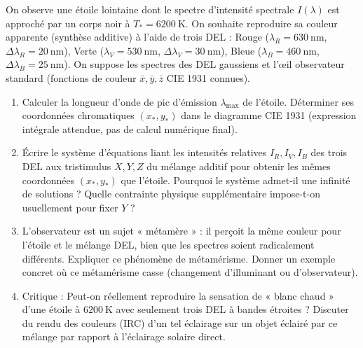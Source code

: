 \documentclass[11pt]{article}
\begin{document}
\begin{exercice}
On observe une étoile lointaine dont le spectre d'intensité spectrale $I(\lambda)$ est approché par un corps noir à $T_* = \SI{6200}{\kelvin}$. On souhaite reproduire sa couleur apparente (synthèse additive) à l'aide de trois DEL : Rouge ($\lambda_R = \SI{630}{\nano\metre}$, $\Delta\lambda_R = \SI{20}{\nano\metre}$), Verte ($\lambda_V = \SI{530}{\nano\metre}$, $\Delta\lambda_V = \SI{30}{\nano\metre}$), Bleue ($\lambda_B = \SI{460}{\nano\metre}$, $\Delta\lambda_B = \SI{25}{\nano\metre}$). On suppose les spectres des DEL gaussiens et l'œil observateur standard (fonctions de couleur $\bar{x}, \bar{y}, \bar{z}$ CIE 1931 connues).
\begin{enumerate}
    \item Calculer la longueur d'onde de pic d'émission $\lambda_{\max}$ de l'étoile. Déterminer ses coordonnées chromatiques $(x_*, y_*)$ dans le diagramme CIE 1931 (expression intégrale attendue, pas de calcul numérique final).
    \item Écrire le système d'équations liant les intensités relatives $I_R, I_V, I_B$ des trois DEL aux tristimulus $X, Y, Z$ du mélange additif pour obtenir les mêmes coordonnées $(x_*, y_*)$ que l'étoile. Pourquoi le système admet-il une infinité de solutions ? Quelle contrainte physique supplémentaire impose-t-on usuellement pour fixer $Y$ ?
    \item L'observateur est un sujet « métamère » : il perçoit la même couleur pour l'étoile et le mélange DEL, bien que les spectres soient radicalement différents. Expliquer ce phénomène de métamérisme. Donner un exemple concret où ce métamérisme casse (changement d'illuminant ou d'observateur).
    \item Critique : Peut-on réellement reproduire la sensation de « blanc chaud » d'une étoile à $\SI{6200}{\kelvin}$ avec seulement trois DEL à bandes étroites ? Discuter du rendu des couleurs (IRC) d'un tel éclairage sur un objet éclairé par ce mélange par rapport à l'éclairage solaire direct.
\end{enumerate}
\end{exercice}
\end{document}
